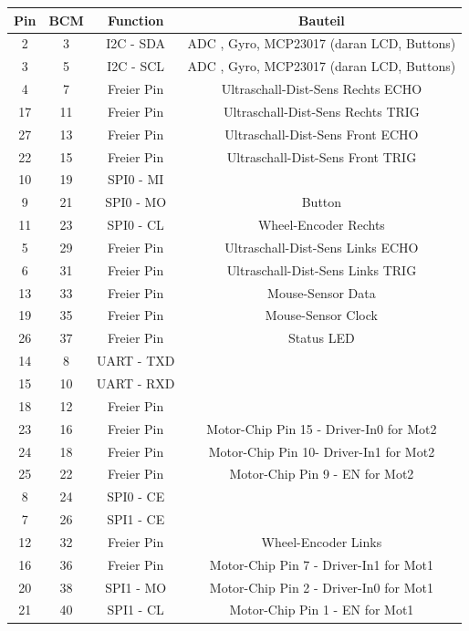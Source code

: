 \documentclass[a4paper,cleardoubleempty,BCOR1cm]{book}
\begin{document}
\begin{center}
	\begin{tabular}{|cc|c|c|}
		\hline
		Pin 	&BCM		& Function 		& Bauteil\\
		\hline
		2		&3			& I2C - SDA		& ADC , Gyro, MCP23017 (daran LCD, Buttons) \\
		3 		&5			& I2C - SCL		& ADC , Gyro, MCP23017 (daran LCD, Buttons)\\
		4		&7			& Freier Pin	& Ultraschall-Dist-Sens Rechts ECHO\\
		17		&11 		& Freier Pin	& Ultraschall-Dist-Sens Rechts TRIG	\\
		27		&13 		& Freier Pin	& Ultraschall-Dist-Sens Front ECHO	\\
		22		&15 		& Freier Pin	& Ultraschall-Dist-Sens Front TRIG	\\
		10		&19 		& SPI0 - MI		& 	\\
		9		&21 		& SPI0 - MO		& Button		\\
		11		&23 		& SPI0 - CL		& Wheel-Encoder Rechts		\\
		5		&29 		& Freier Pin	& Ultraschall-Dist-Sens Links ECHO		\\
		6		&31 		& Freier Pin	& Ultraschall-Dist-Sens Links TRIG	\\
		13		&33 		& Freier Pin	& Mouse-Sensor Data	\\	
		19		&35 		& Freier Pin	& Mouse-Sensor Clock	\\
		26		&37 		& Freier Pin	& Status LED\\
		14		&8 			& UART - TXD	& 	\\
		15		&10 		& UART - RXD	&  	\\
		18		&12 		& Freier Pin	& 	\\
		23 		&16 		& Freier Pin	& Motor-Chip Pin 15 - Driver-In0 for Mot2	\\
		24		&18 		& Freier Pin	& Motor-Chip Pin 10- Driver-In1 for Mot2	\\
		25		&22 		& Freier Pin	& Motor-Chip Pin 9 - EN for Mot2	\\
		8		&24 		& SPI0 - CE		& 	\\
		7		&26 		& SPI1 - CE		&  	\\
		12		&32 		& Freier Pin	& Wheel-Encoder Links	\\
		16		&36 		& Freier Pin	& Motor-Chip Pin 7 - Driver-In1 for Mot1	\\
		20		&38 		& SPI1 - MO		& Motor-Chip Pin 2 - Driver-In0 for Mot1		\\
		21		&40 		& SPI1	- CL	& Motor-Chip Pin 1 - EN for Mot1	\\
		\hline
	\end{tabular}
\end{center}
\newpage
\end{document}
